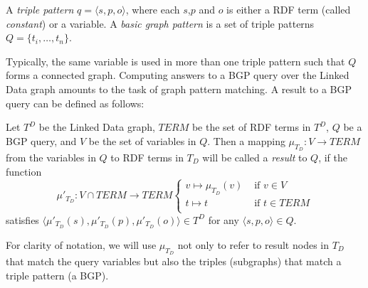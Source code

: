 \begin{definition}
  A \emph{triple pattern} $q=\langle s,p,o \rangle$, where each $s$,$p$ and $o$ is either a RDF term (called \emph{constant}) or a variable. A \emph{basic graph pattern} is a set of triple patterns $Q= \{t_i,\ldots,t_n\}$. 
\end{definition}

Typically, the same variable is used in more than one triple pattern such that $Q$ forms a connected graph. Computing answers to a BGP query over the Linked Data graph amounts to the
task of graph pattern matching. A result to a BGP query can be defined as
follows:

\begin{definition}[Result]
Let $T^D$ be the Linked Data graph, $TERM$ be the set of RDF terms in $T^D$, $Q$ be a BGP query, and $V$ be the set of variables in $Q$. Then a mapping
$\mu_{T_D}: V \to TERM$ from the variables in $Q$ to RDF terms
in $T_D$ will be called a \emph{result} to $Q$, if the function
\[
\mu'_{T_D}: V \cap TERM \to TERM \left\{
\begin{array}{ll}
v \mapsto \mu_{T_D}(v) & \mbox{ if } v\in V \\
t \mapsto t & \mbox{ if } t \in TERM\\
\end{array}\right.
\]
satisfies $\langle \mu'_{T_D}(s),\mu'_{T_D}(p), \mu'_{T_D}(o) \rangle \in T^D$ for any $\langle s,p,o \rangle \in Q$. 
\end{definition}

For clarity of notation, we will use $\mu_{T_D}$ not only to refer to result nodes in ${T_D}$ that match the query variables but also the triples (subgraphs) that match a triple pattern (a BGP). 


